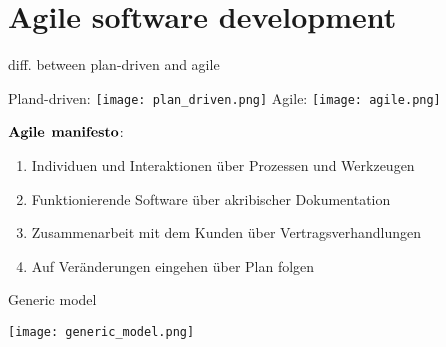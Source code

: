 \section{Agile software development}
\begin{table}[H]
\caption{diff. between plan-driven and agile}
Pland-driven: \newline
\texttt{[image: plan\_driven.png]}
Agile: \newline
\texttt{[image: agile.png]}
\end{table}
$\bold{Agile}$ $\bold{manifesto}$:
\begin{enumerate}
	\item Individuen und Interaktionen über Prozessen und Werkzeugen
	\item Funktionierende Software über akribischer Dokumentation
	\item Zusammenarbeit mit dem Kunden über Vertragsverhandlungen
	\item Auf Veränderungen eingehen über Plan folgen
\end{enumerate}
\begin{table}[H]
\caption{Generic model}
\texttt{[image: generic\_model.png]}
\end{table}
